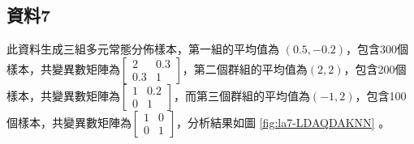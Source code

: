 \subsection{資料7}
此資料生成三組多元常態分佈樣本，第一組的平均值為 $(0.5, -0.2)$，包含300個樣本，共變異數矩陣為$\begin{bmatrix}2 & 0.3 \\0.3 & 1 \end{bmatrix}$，第二個群組的平均值為$(2, 2)$，包含200個樣本，共變異數矩陣為$\begin{bmatrix}1 & 0.2 \\0 & 1 \end{bmatrix}$，而第三個群組的平均值為$(-1, 2)$，包含100個樣本，共變異數矩陣為$\begin{bmatrix}1 & 0 \\0 & 1 \end{bmatrix}$，分析結果如圖 \ref{fig:la7-LDAQDAKNN} 。

